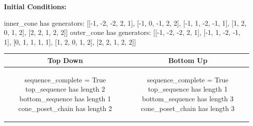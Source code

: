 \documentclass[10pt]{article}
\begin{document}
\textbf{Initial Conditions:}
\begin{SAGE}
inner_cone has generators: 
[[-1, -2, -2, 2, 1], [-1, 0, -1, 2, 2], [-1, 1, -2, -1, 1], [1, 2, 0, 1, 2], [2, 2, 1, 2, 2]]
outer_cone has generators: 
[[-1, -2, -2, 2, 1], [-1, 1, -2, -1, 1], [0, 1, 1, 1, 1], [1, 2, 0, 1, 2], [2, 2, 1, 2, 2]]

\end{SAGE}
\begin{tabular}{c|c}
\textbf{Top Down} & \textbf{Bottom Up} \\ \hline  
\begin{SAGE}
sequence_complete = True
top_sequence has length 2
bottom_sequence has length 1
cone_poset_chain has length 2
\end{SAGE} 
&
\begin{SAGE}
sequence_complete = True
top_sequence has length 1
bottom_sequence has length 3
cone_poset_chain has length 3
\end{SAGE} 
\\ \hline


\end{tabular}
\end{document}
